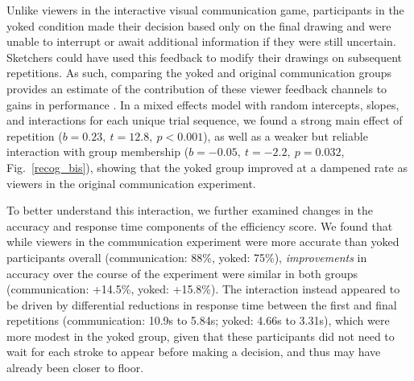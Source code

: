 \documentclass[10pt,letterpaper]{article}
\begin{document}
Unlike viewers in the interactive visual communication game, participants in the yoked condition made their decision based only on the final drawing and were unable to interrupt or await additional information if they were still uncertain.
Sketchers could have used this feedback to modify their drawings on subsequent repetitions.
As such, comparing the yoked and original communication groups provides an estimate of the contribution of these viewer feedback channels to gains in performance \cite{schober_understanding_1989}.
In a mixed effects model with random intercepts, slopes, and interactions for each unique trial sequence, we found a %
strong main effect of repetition ($b = 0.23, ~t = 12.8,~p < 0.001$), as well as a weaker but reliable interaction with group membership ($b = -0.05, ~t = -2.2, ~p = 0.032$, Fig.~\ref{recog_bis}), showing that the yoked group improved at a dampened rate as viewers in the original communication experiment.

To better understand this interaction, we further examined changes in the accuracy and response time components of the efficiency score.
We found that while viewers in the communication experiment were more accurate than yoked participants overall (communication: 88\%, yoked: 75\%), %
\emph{improvements} in accuracy over the course of the experiment were similar in both groups (communication: +14.5\%, yoked: +15.8\%).
The interaction instead appeared to be driven by differential reductions in response time between the first and final repetitions (communication: 10.9s to 5.84s; yoked: 4.66s to 3.31s), which were more modest in the yoked group, given that these participants did not need to wait for each stroke to appear before making a decision, and thus may have already been closer to floor.
\end{document}
